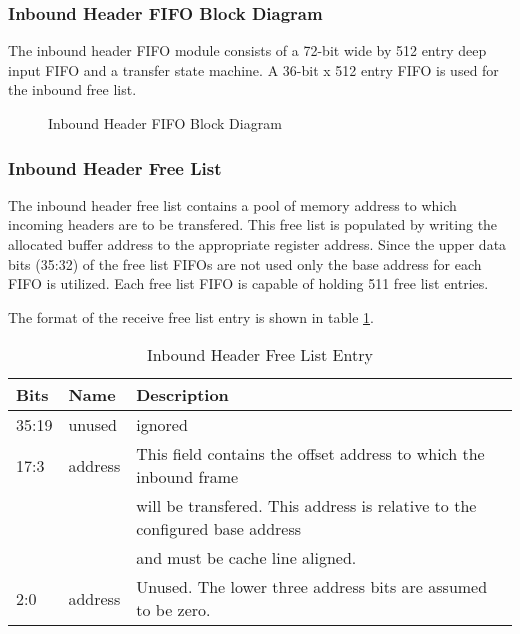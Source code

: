 \documentclass[11pt]{article}
\begin{document}
\subsubsection{Inbound Header FIFO Block Diagram}

The inbound header FIFO module consists of a 72-bit wide by 512 entry deep input FIFO and a transfer state machine. A 36-bit x 512 entry FIFO is used
for the inbound free list. 

\begin{figure}[H]
   \centering
   \caption{Inbound Header FIFO Block Diagram}
   \label{fig:ib_head_block}
\end{figure}

\subsubsection{Inbound Header Free List}

The inbound header free list contains a pool of memory address to which incoming headers are to be transfered.
This free list is populated by writing the allocated buffer address to the appropriate register address.
Since the upper data bits (35:32) of the free list FIFOs are not used only the base address for each FIFO is utilized. 
Each free list FIFO is capable of holding 511 free list entries.

The format of the receive free list entry is shown in table \ref{tab:ib_rx_flist}.

\begin{table}[H]
\small
\centering
   \begin{tabular}{| l | l | l | } 
      \hline \textbf{Bits} & \textbf{Name} & \textbf{Description} \\
      \hline 35:19         & unused        & ignored \\
      \hline 17:3          & address       & This field contains the offset address to which the inbound frame \\
                           &               & will be transfered. This address is relative to the configured base address  \\
                           &               & and must be cache line aligned.                                              \\
      \hline 2:0           & address       & Unused. The lower three address bits are assumed to be zero.               \\
      \hline
   \end{tabular}
   \caption{Inbound Header Free List Entry}
   \label{tab:ib_rx_flist}
\end{table}
\end{document}
